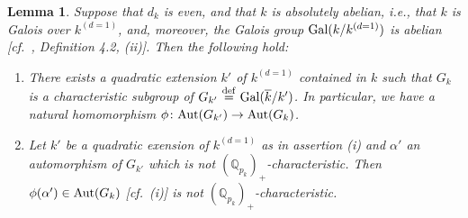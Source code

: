 \documentclass[12pt,showkeys]{amsart}
\theoremstyle{theorem}
\newtheorem{lem}[theorem]{Lemma}
\theoremstyle{definition}
\def\bQ{{\mathbb Q}}
\def\defeq{ \ {\stackrel{\mathrm{def}}{=}} \ }
\begin{document}
\begin{lem}\label{old:lemma:2.7}
Suppose that $d_k$ is even, and that  $k$ is absolutely abelian, i.e., that $k$ is Galois over $k^{(d=1)}$, and, moreover, the Galois group ${\rm Gal}(k/k^{(d=1)})$ is abelian [cf.\ \cite{Hoshi2}, Definition 4.2, (ii)]. Then the following hold: 
\begin{enumerate}[label=(\roman*),ref=(\roman*)]
	\item[\rm (i)] There exists a quadratic extension $k'$ of $k^{(d = 1)}$ contained in $k$  such that $G_k$ is a characteristic subgroup of $G_{k'} \defeq {\rm Gal}(\overline{k}/k')$. In particular, we have a natural homomorphism $\phi \colon {\rm Aut}(G_{k'}) \rightarrow {\rm Aut}(G_k)$. \label{lemma:2.7:statement:1} 
    \item[\rm (ii)] Let $k'$ be a quadratic exension of $k^{(d=1)}$ as in assertion (i) and $\alpha'$ an automorphism of $G_{k'}$ which is not $(\bQ_{p_k})_+$-characteristic. Then $\phi(\alpha') \in {\rm Aut}(G_k)$ [cf.\ (i)] is not $(\bQ_{p_k})_+$-characteristic. \label{lemma:2.7:statement:2}
\end{enumerate}
\end{lem}
\end{document}
